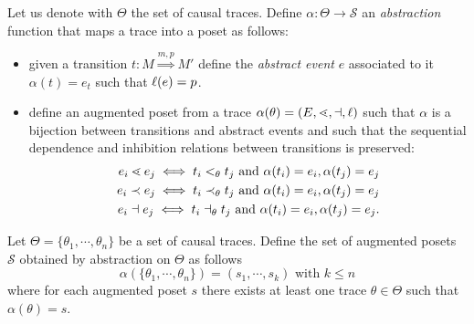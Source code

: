 \begin{definition}
  \label{def:abstraction}
  Let us denote with $\Theta$ the set of causal traces.
  Define $\alpha:\Theta\to\mathcal{S}$ an \emph{abstraction} function that maps a trace into a poset as follows:
    \begin{itemize}
    \item given a transition $t:M\overset{m,p}{\Rightarrow} M'$ define the \emph{abstract event} $e$ associated to it
      $\alpha(t) = e_t$ such that $\ell(e) = p$.
    \item define an augmented poset from a trace $\alpha(\theta) = (E,\lessdot,\dashv,\ell)$ such that $\alpha$ is a bijection between transitions and abstract events and such that the sequential dependence and inhibition relations between transitions is preserved:
      \begin{align*}
        e_i \lessdot e_j \iff t_i <_{\theta} t_j \text{ and } \alpha(t_i)=e_i, \alpha(t_j)=e_j\\
        e_i \prec e_j \iff t_i \prec_{\theta} t_j \text{ and } \alpha(t_i)=e_i, \alpha(t_j)=e_j\\
        e_i \dashv e_j \iff t_i \dashv_{\theta} t_j \text{ and } \alpha(t_i)=e_i, \alpha(t_j)=e_j.
      \end{align*}
    \end{itemize}
    Let $\Theta = \{\theta_1,\cdots,\theta_n\}$ be a set of causal traces.
    Define the set of augmented posets $\mathcal{S}$ obtained by abstraction on $\Theta$ as follows
    \[
    \alpha(\{\theta_1,\cdots,\theta_n\}) = (s_1,\cdots, s_k)\text{ with }k\leq n
    \]
    where for each augmented poset $s$ there exists at least one trace $\theta\in\Theta$ such that $\alpha(\theta) = s$.
\end{definition}

